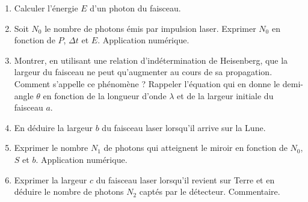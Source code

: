 \begin{enumerate}
	\item Calculer l'énergie $E$ d'un photon du faisceau.
	\item Soit $N_0$ le nombre de photons émis par impulsion laser. Exprimer $N_0$ en fonction de $P$, $\Delta t$ et $E$. Application numérique.
	\item Montrer, en utilisant une relation d'indétermination de Heisenberg, que la largeur du faisceau ne peut qu'augmenter au cours de sa propagation. Comment s'appelle ce phénomène ? Rappeler l'équation qui en donne le demi-angle $\theta$ en fonction de la longueur d'onde $\lambda$ et de la largeur initiale du faisceau $a$.
	\item En déduire la largeur $b$ du faisceau laser lorsqu'il arrive sur la Lune.
	\item Exprimer le nombre $N_1$ de photons qui atteignent le miroir en fonction de $N_0$, $S$ et $b$. Application numérique. 
	\item Exprimer la largeur $c$ du faisceau laser lorsqu'il revient sur Terre et en déduire le nombre de photons $N_2$ captés par le détecteur. Commentaire.
\end{enumerate}
